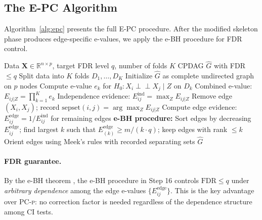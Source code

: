 \documentclass[11pt]{article}
\newcommand{\epc}{\textsc{E-PC}}
\newcommand{\pcp}{\textsc{PC-p}}
\newcommand{\indep}{\perp\!\!\!\perp}
\newcommand{\R}{\mathbb{R}}
\begin{document}
\subsection{The E-PC Algorithm}

Algorithm~\ref{alg:epc} presents the full \epc{} procedure. After the modified skeleton phase produces edge-specific e-values, we apply the e-BH procedure for FDR control.

\begin{algorithm}[t]
\caption{E-PC: E-Value Constraint-Based Causal Discovery}
\label{alg:epc}
\begin{algorithmic}[1]
\REQUIRE Data $\mathbf{X} \in \R^{n \times p}$, target FDR level $q$, number of folds $K$
\ENSURE CPDAG $\hat{G}$ with FDR $\leq q$
\STATE Split data into $K$ folds $D_1, \ldots, D_K$
\STATE Initialize $\hat{G}$ as complete undirected graph on $p$ nodes
                \STATE Compute e-value $e_k$ for $H_0: X_i \indep X_j \mid Z$ on $D_k$
            \ENDFOR
            \STATE Combined e-value: $E_{ij|Z} = \prod_{k=1}^{K} e_k$
        \ENDFOR
        \STATE Independence evidence: $E^{\text{ind}}_{ij} = \max_Z E_{ij|Z}$
            \STATE Remove edge $(X_i, X_j)$; record $\text{sepset}(i,j) = \arg\max_Z E_{ij|Z}$
        \ENDIF
    \ENDFOR
\ENDFOR
\STATE Compute edge evidence: $E^{\text{edge}}_{ij} = 1 / E^{\text{ind}}_{ij}$ for remaining edges
\STATE \textbf{e-BH procedure:} Sort edges by decreasing $E^{\text{edge}}_{ij}$; find largest $k$ such that $E^{\text{edge}}_{(k)} \geq m / (k \cdot q)$; keep edges with rank $\leq k$
\STATE Orient edges using Meek's rules with recorded separating sets
\RETURN $\hat{G}$
\end{algorithmic}
\end{algorithm}

\paragraph{FDR guarantee.}
By the e-BH theorem \citep{wang2022false}, the e-BH procedure in Step 16 controls $\text{FDR} \leq q$ under \emph{arbitrary dependence} among the edge e-values $\{E^{\text{edge}}_{ij}\}$. This is the key advantage over \pcp{}: no correction factor is needed regardless of the dependence structure among CI tests.
\end{document}
